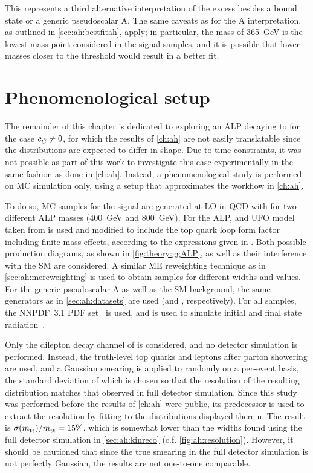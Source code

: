This represents a third alternative interpretation of the excess besides a \ttbar bound state or a generic pseudoscalar A. The same caveats as for the A interpretation, as outlined in \cref{sec:ah:bestfitah}, apply; in particular, the mass of \SI{365}{\GeV} is the lowest mass point considered in the signal samples, and it is possible that lower masses closer to the \ttbar threshold would result in a better fit.

\section{Phenomenological setup}
\label{sec:alps:setup}

The remainder of this chapter is dedicated to exploring an ALP decaying to \ttbar for the case $c_{\tilde{G}} \neq 0$, for which the results of \cref{ch:ah} are not easily translatable since the distributions are expected to differ in shape. Due to time constraints, it was not possible as part of this work to investigate this case experimentally in the same fashion as done in \cref{ch:ah}. Instead, a phenomenological study is performed on MC simulation only, using a setup that approximates the workflow in \cref{ch:ah}.

To do so, MC samples for the signal are generated at LO in QCD with \madgraph for two different ALP masses (\SI{400}{\GeV} and \SI{800}{\GeV}). For the ALP, and UFO model taken from  is used and modified to include the top quark loop form factor including finite mass effects, according to the expressions given in . Both possible production diagrams, as shown in \cref{fig:theory:ggALP}, as well as their interference with the SM are considered. A similar ME reweighting technique as in \cref{sec:ah:mereweighting} is used to obtain samples for different widths and \cG values. For the generic pseudoscalar A as well as the SM \ttbar background, the same generators as in \cref{sec:ah:datasets} are used (\madgraph and \powhegvtwo \hvq, respectively). For all samples, the NNPDF~3.1 PDF set~\cite{NNPDF:2017mvq} is used, and  is used to simulate initial and final state radiation~\cite{Pythia:2015}.

Only the dilepton decay channel of \ttbar is considered, and no detector simulation is performed. Instead, the truth-level top quarks and leptons after parton showering are used, and a Gaussian smearing is applied to \mtt randomly on a per-event basis, the standard deviation of which is chosen so that the resolution of the resulting distribution matches that observed in full detector simulation. Since this study was performed before the results of \cref{ch:ah} were public, its predecessor  is used to extract the resolution by fitting to the \mtt distributions displayed therein. The result is $\sigma(m_{\mathrm{t \bar{t}}}) / m_{\mathrm{t \bar{t}}} = 15\%$, which is somewhat lower than the widths found using the full detector simulation in \cref{sec:ah:kinreco} (c.f. \cref{fig:ah:resolution}). However, it should be cautioned that since the true \mtt smearing in the full detector simulation is not perfectly Gaussian, the results are not one-to-one comparable. 

